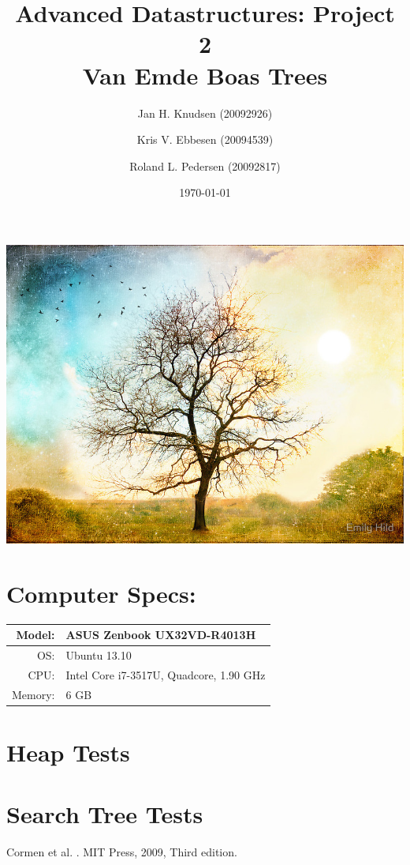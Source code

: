 \documentclass[a4paper, 12pt]{article}
\title{Advanced Datastructures: Project 2\\
Van Emde Boas Trees}
\date{\today}
\author{Jan H. Knudsen (20092926)
\and
Kris V. Ebbesen (20094539)
\and
Roland L. Pedersen (20092817)
}
\begin{document}
\maketitle
\begin{center}
	\includegraphics[width=\textwidth]{graphs/flat,800x800,070,f.jpg}
\end{center}
\newpage
\tableofcontents
\newpage





\section{Computer Specs:}
\begin{tabular}{| r  l |} \hline
Model: &  ASUS Zenbook UX32VD-R4013H \\ \hline
OS: & Ubuntu 13.10 \\ \hline
CPU: & Intel Core i7-3517U, Quadcore, 1.90 GHz \\ \hline
Memory: & 6 GB\\ \hline
\end{tabular}

\section{Heap Tests}


\section{Search Tree Tests}




\begin{thebibliography}{9}

Cormen et al.
.
\newblock MIT Press, 2009, Third edition.

\end{thebibliography}
\end{document}
